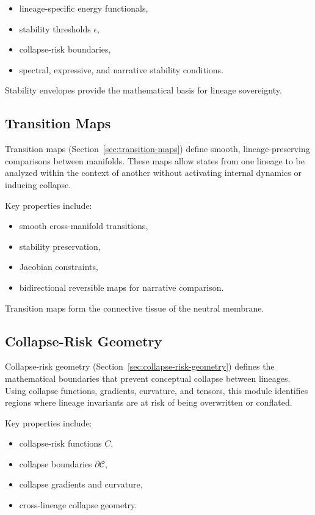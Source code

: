 \begin{itemize}
    \item lineage-specific energy functionals,
    \item stability thresholds $\epsilon$,
    \item collapse-risk boundaries,
    \item spectral, expressive, and narrative stability conditions.
\end{itemize}

Stability envelopes provide the mathematical basis for lineage sovereignty.

\subsection{Transition Maps}

Transition maps (Section~\ref{sec:transition-maps}) define smooth,
lineage-preserving comparisons between manifolds. These maps allow states from
one lineage to be analyzed within the context of another without activating
internal dynamics or inducing collapse.

Key properties include:

\begin{itemize}
    \item smooth cross-manifold transitions,
    \item stability preservation,
    \item Jacobian constraints,
    \item bidirectional reversible maps for narrative comparison.
\end{itemize}

Transition maps form the connective tissue of the neutral membrane.

\subsection{Collapse-Risk Geometry}

Collapse-risk geometry (Section~\ref{sec:collapse-risk-geometry}) defines the
mathematical boundaries that prevent conceptual collapse between lineages. Using
collapse functions, gradients, curvature, and tensors, this module identifies
regions where lineage invariants are at risk of being overwritten or conflated.

Key properties include:

\begin{itemize}
    \item collapse-risk functions $C$,
    \item collapse boundaries $\partial \mathcal{C}$,
    \item collapse gradients and curvature,
    \item cross-lineage collapse geometry.
\end{itemize}

